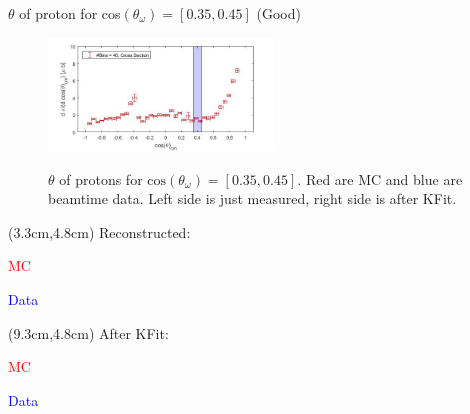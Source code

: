 \documentclass[
		10pt
		]{beamer}
\begin{document}
\begin{frame}{$ \theta$ of proton for cos$(\theta_{\omega})=[0.35,0.45]$ (Good)}
	
		\begin{figure}
	\hspace{0cm}  \vspace{-1cm}
	\includegraphics[width=6cm]{Plots/9}
\end{figure}

	
	\begin{figure}%
		\centering
		\qquad
		\captionsetup{labelformat=empty}
		\caption{$\theta$ of protons for $\textrm{cos}(\theta_{\omega}) = [0.35, 0.45] $. Red are MC and blue are beamtime data. Left side is just measured, right side is after KFit.}%
		\label{fig:example}%
	\end{figure}
	
	
		\begin{textblock*}{4.5cm}(3.3cm,4.8cm)
		\footnotesize Reconstructed:
		
		\footnotesize \textcolor{red}{MC}
		
		\footnotesize \textcolor{blue}{Data}
	\end{textblock*}
	
	\begin{textblock*}{4.5cm}(9.3cm,4.8cm)
		\footnotesize After KFit:
		
		\footnotesize \textcolor{red}{MC}
		
		\footnotesize \textcolor{blue}{Data}
	\end{textblock*}
	
	
	
	
\end{frame}
\end{document}

